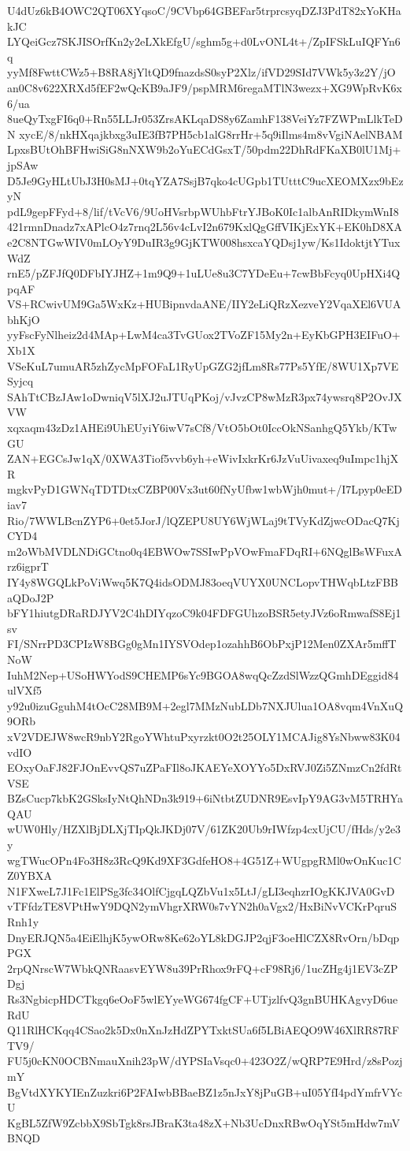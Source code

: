 U4dUz6kB4OWC2QT06XYqsoC/9CVbp64GBEFar5trprcsyqDZJ3PdT82xYoKHakJC
LYQeiGcz7SKJISOrfKn2y2eLXkEfgU/sghm5g+d0LvONL4t+/ZpIFSkLuIQFYn6q
yyMf8FwttCWz5+B8RA8jYltQD9fnazdsS0syP2Xlz/ifVD29SId7VWk5y3z2Y/jO
an0C8v622XRXd5fEF2wQcKB9aJF9/pspMRM6regaMTlN3wezx+XG9WpRvK6x6/ua
8ueQyTxgFI6q0+Rn55LLJr053ZrsAKLqaDS8y6ZamhF138VeiYz7FZWPmLlkTeDN
xycE/8/nkHXqajkbxg3uIE3fB7PH5cb1alG8rrHr+5q9iIlms4m8vVgiNAelNBAM
LpxsBUtOhBFHwiSiG8nNXW9b2oYuECdGsxT/50pdm22DhRdFKaXB0lU1Mj+jpSAw
D5Je9GyHLtUbJ3H0sMJ+0tqYZA7SsjB7qko4cUGpb1TUtttC9ucXEOMXzx9bEzyN
pdL9gepFFyd+8/lif/tVcV6/9UoHVsrbpWUhbFtrYJBoK0Ic1albAnRIDkymWnI8
421rmnDnadz7xAPlcO4z7rnq2L56v4cLvI2n679KxlQgGffVIKjExYK+EK0hD8XA
e2C8NTGwWIV0mLOyY9DuIR3g9GjKTW008hsxcaYQDsj1yw/Ks1IdoktjtYTuxWdZ
rnE5/pZFJfQ0DFbIYJHZ+1m9Q9+1uLUe8u3C7YDeEu+7cwBbFcyq0UpHXi4QpqAF
VS+RCwivUM9Ga5WxKz+HUBipnvdaANE/IIY2eLiQRzXezveY2VqaXEl6VUAbhKjO
yyFscFyNlheiz2d4MAp+LwM4ca3TvGUox2TVoZF15My2n+EyKbGPH3EIFuO+Xb1X
VSeKuL7umuAR5zhZycMpFOFaL1RyUpGZG2jfLm8Rs77Ps5YfE/8WU1Xp7VESyjcq
SAhTtCBzJAw1oDwniqV5lXJ2uJTUqPKoj/vJvzCP8wMzR3px74ywsrq8P2OvJXVW
xqxaqm43zDz1AHEi9UhEUyiY6iwV7sCf8/VtO5bOt0IccOkNSanhgQ5Ykb/KTwGU
ZAN+EGCsJw1qX/0XWA3Tiof5vvb6yh+eWivIxkrKr6JzVuUivaxeq9uImpc1hjXR
mgkvPyD1GWNqTDTDtxCZBP00Vx3ut60fNyUfbw1wbWjh0mut+/I7Lpyp0eEDiav7
Rio/7WWLBcnZYP6+0et5JorJ/lQZEPU8UY6WjWLaj9tTVyKdZjwcODacQ7KjCYD4
m2oWbMVDLNDiGCtno0q4EBWOw7SSIwPpVOwFmaFDqRI+6NQglBsWFuxArz6igprT
IY4y8WGQLkPoViWwq5K7Q4idsODMJ83oeqVUYX0UNCLopvTHWqbLtzFBBaQDoJ2P
bFY1hiutgDRaRDJYV2C4hDIYqzoC9k04FDFGUhzoBSR5etyJVz6oRmwafS8Ej1sv
FI/SNrrPD3CPIzW8BGg0gMn1IYSVOdep1ozahhB6ObPxjP12Men0ZXAr5mffTNoW
IuhM2Nep+USoHWYodS9CHEMP6sYc9BGOA8wqQcZzdSlWzzQGmhDEggid84ulVXf5
y92u0izuGguhM4tOcC28MB9M+2egl7MMzNubLDb7NXJUlua1OA8vqm4VnXuQ9ORb
xV2VDEJW8wcR9nbY2RgoYWhtuPxyrzkt0O2t25OLY1MCAJig8YsNbww83K04vdIO
EOxyOaFJ82FJOnEvvQS7uZPaFIl8oJKAEYeXOYYo5DxRVJ0Zi5ZNmzCn2fdRtVSE
BZsCucp7kbK2GSksIyNtQhNDn3k919+6iNtbtZUDNR9EsvIpY9AG3vM5TRHYaQAU
wUW0Hly/HZXlBjDLXjTIpQkJKDj07V/61ZK20Ub9rIWfzp4cxUjCU/fHds/y2e3y
wgTWucOPn4Fo3H8z3RcQ9Kd9XF3GdfeHO8+4G51Z+WUgpgRMl0wOnKuc1CZ0YBXA
N1FXweL7J1Fc1ElPSg3fc34OlfCjgqLQZbVu1x5LtJ/gLI3eqhzrIOgKKJVA0GvD
vTFfdzTE8VPtHwY9DQN2ymVhgrXRW0s7vYN2h0aVgx2/HxBiNvVCKrPqruSRnh1y
DnyERJQN5a4EiElhjK5ywORw8Ke62oYL8kDGJP2qjF3oeHlCZX8RvOrn/bDqpPGX
2rpQNrscW7WbkQNRaasvEYW8u39PrRhox9rFQ+cF98Rj6/1ucZHg4j1EV3cZPDgj
Rs3NgbicpHDCTkgq6eOoF5wlEYyeWG674fgCF+UTjzlfvQ3gnBUHKAgvyD6ueRdU
Q11RlHCKqq4CSao2k5Dx0nXnJzHdZPYTxktSUa6f5LBiAEQO9W46XlRR87RFTV9/
FU5j0cKN0OCBNmauXnih23pW/dYPSIaVsqc0+423O2Z/wQRP7E9Hrd/z8sPozjmY
BgVtdXYKYIEnZuzkri6P2FAIwbBBaeBZ1z5nJxY8jPuGB+uI05YfI4pdYmfrVYcU
KgBL5ZfW9ZcbbX9SbTgk8rsJBraK3ta48zX+Nb3UcDnxRBwOqYSt5mHdw7mVBNQD
